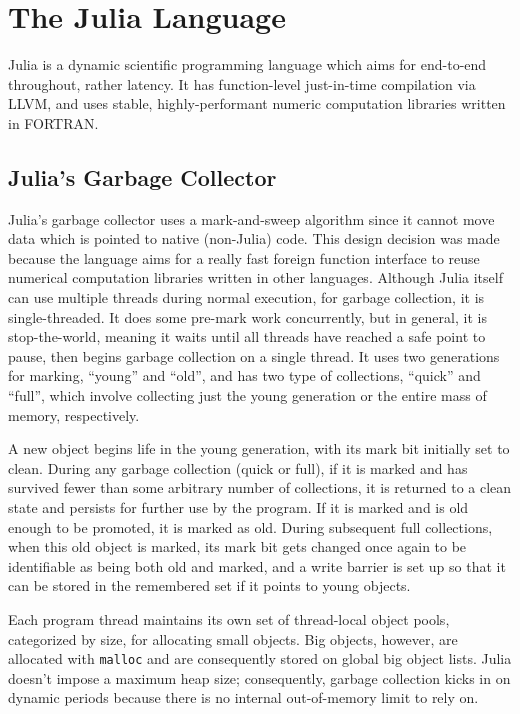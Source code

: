 \section{The Julia Language} \label{julia}
Julia is a dynamic scientific programming language which aims for end-to-end throughout, rather latency.
It has function-level just-in-time compilation via LLVM, and uses stable, highly-performant numeric computation libraries written in FORTRAN.

\subsection{Julia's Garbage Collector}
Julia's garbage collector uses a mark-and-sweep algorithm since it cannot move data which is pointed to native (non-Julia) code.
This design decision was made because the language aims for a really fast foreign function interface to reuse numerical computation libraries written in other languages.
Although Julia itself can use multiple threads during normal execution, for garbage collection, it is single-threaded.
It does some pre-mark work concurrently, but in general, it is stop-the-world, meaning it waits until all threads have reached a safe point to pause, then begins garbage collection on a single thread.
It uses two generations for marking, ``young'' and ``old'', and has two type of collections, ``quick'' and ``full'', which involve collecting just the young generation or the entire mass of memory, respectively.

A new object begins life in the young generation, with its mark bit initially set to clean.
During any garbage collection (quick or full), if it is marked and has survived fewer than some arbitrary number of collections, it is returned to a clean state and persists for further use by the program.
If it is marked and is old enough to be promoted, it is marked as old.
During subsequent full collections, when this old object is marked, its mark bit gets changed once again to be identifiable as being both old and marked, and a write barrier is set up so that it can be stored in the remembered set if it points to young objects.

Each program thread maintains its own set of thread-local object pools, categorized by size, for allocating small objects.
Big objects, however, are allocated with \texttt{malloc} and are consequently stored on global big object lists.
Julia doesn't impose a maximum heap size; consequently, garbage collection kicks in on dynamic periods because there is no internal out-of-memory limit to rely on.

